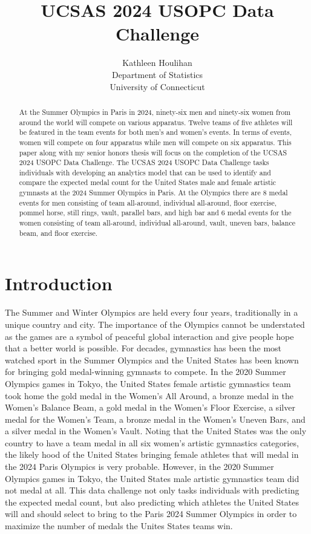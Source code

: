 \documentclass[12pt]{article}
\title{UCSAS 2024 USOPC Data Challenge}
\author{Kathleen Houlihan\\
  Department of Statistics\\
  University of Connecticut
}
\begin{document}
\maketitle

\begin{abstract}

  At the Summer Olympics in Paris in 2024, ninety-six men and ninety-six women 
  from around the world will compete on various apparatus. Twelve teams of five athletes will be 
  featured in the team events for both men's and women's events. In terms of events, women
  will compete on four apparatus while men will compete on six apparatus. This paper along 
  with my senior honors thesis will focus on the completion of the UCSAS 2024 USOPC Data Challenge. 
  The UCSAS 2024 USOPC Data Challenge tasks individuals with developing an analytics model that
  can be used to identify and compare the expected medal count for the United States male and 
  female artistic gymnasts at the 2024 Summer Olympics in Paris. At the Olympics there are 8 
  medal events for men consisting of team all-around, individual all-around, floor exercise, 
  pommel horse, still rings, vault, parallel bars, and high bar and 6 medal events for the women 
  consisting of team all-around, individual all-around, vault, uneven bars, balance beam, and 
  floor exercise. 

\end{abstract}

\section{Introduction}
\label{sec:intro}

The Summer and Winter Olympics are held every four years, traditionally in a unique country and city.
 The importance of the Olympics cannot be understated as the games are a symbol of peaceful global 
 interaction and give people hope that a better world is possible. For decades, gymnastics has been 
 the most watched sport in the Summer Olympics and the United States has been known for bringing gold 
 medal-winning gymnasts to compete. In the 2020 Summer Olympics games in Tokyo, the United States 
 female artistic gymnastics team took home the gold medal in the Women's All Around, a bronze medal 
 in the Women's Balance Beam, a gold medal in the Women's Floor Exercise, a silver medal for the Women's
 Team, a bronze medal in the Women's Uneven Bars, and a silver medal in the Women's Vault. Noting that 
 the United States was the only country to have a team medal in all six women's artistic gymnastics 
  categories, the likely hood of the United States bringing female athletes that will medal in the 2024 
  Paris Olympics is very probable. However, in the 2020 Summer Olympics games in Tokyo, the United States 
  male artistic gymnastics team did not medal at all. This data challenge not only tasks individuals 
  with predicting the expected medal count, but also predicting which athletes the United States will 
  and should select to bring to the Paris 2024 Summer Olympics in order to maximize the number of medals 
  the Unites States teams win. 
\end{document}
